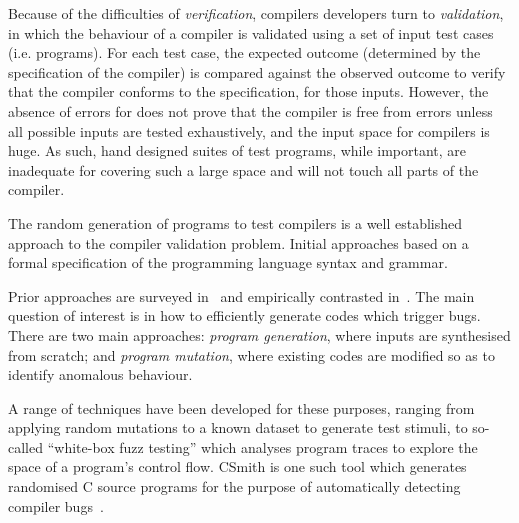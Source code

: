 Because of the difficulties of \emph{verification}, compilers developers turn to \emph{validation}, in which the behaviour of a compiler is validated using a set of input test cases (i.e. programs). For each test case, the expected outcome (determined by the specification of the compiler) is compared against the observed outcome to verify that the compiler conforms to the specification, for those inputs. However, the absence of errors for does not prove that the compiler is free from errors unless all possible inputs are tested exhaustively, and the input space for compilers is huge. As such, hand designed suites of test programs, while important, are inadequate for covering such a large space and will not touch all parts of the compiler.

The random generation of programs to test compilers is a well established approach to the compiler validation problem. Initial approaches  based on a formal specification of the programming language syntax and grammar.

Prior approaches are surveyed in~\cite{Kossatchev2005,Boujarwah1997} and empirically contrasted in~\cite{Chen2014a}. The main question of interest is in how to efficiently generate codes which trigger bugs. There are two main approaches: \emph{program generation}, where inputs are synthesised from scratch; and \emph{program mutation}, where existing codes are modified so as to identify anomalous behaviour.

 A range of techniques have been developed for these purposes, ranging from applying random mutations to a known dataset to generate test stimuli, to so-called ``white-box fuzz testing'' which analyses program traces to explore the space of a program's control flow. CSmith is one such tool which generates randomised C source programs for the purpose of automatically detecting compiler bugs~\cite{Yang2012}.

